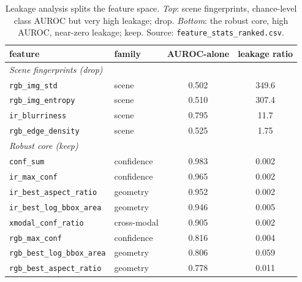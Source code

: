 \begin{table}[htbp]
    \centering
    \caption{Leakage analysis splits the feature space. \emph{Top}: scene fingerprints, chance-level class AUROC but very high leakage; drop. \emph{Bottom}: the robust core, high AUROC, near-zero leakage; keep. Source: \texttt{feature\_stats\_ranked.csv}.}
    \label{tab:leakage}
    \begin{tabular}{llcc}
        \toprule
        feature & family & AUROC-alone & leakage ratio \\
        \midrule
        \multicolumn{4}{l}{\emph{Scene fingerprints (drop)}} \\
        \texttt{rgb\_img\_std}       & scene       & 0.502 & 349.6 \\
        \texttt{rgb\_img\_entropy}   & scene       & 0.510 & 307.4 \\
        \texttt{ir\_blurriness}      & scene       & 0.795 & 11.7 \\
        \texttt{rgb\_edge\_density}  & scene       & 0.525 & 1.75 \\
        \midrule
        \multicolumn{4}{l}{\emph{Robust core (keep)}} \\
        \texttt{conf\_sum}             & confidence  & 0.983 & 0.002 \\
        \texttt{ir\_max\_conf}         & confidence  & 0.965 & 0.002 \\
        \texttt{ir\_best\_aspect\_ratio} & geometry  & 0.952 & 0.002 \\
        \texttt{ir\_best\_log\_bbox\_area} & geometry & 0.946 & 0.005 \\
        \texttt{xmodal\_conf\_ratio}   & cross-modal & 0.905 & 0.002 \\
        \texttt{rgb\_max\_conf}        & confidence  & 0.816 & 0.004 \\
        \texttt{rgb\_best\_log\_bbox\_area} & geometry & 0.806 & 0.059 \\
        \texttt{rgb\_best\_aspect\_ratio} & geometry & 0.778 & 0.011 \\
        \bottomrule
    \end{tabular}
\end{table}


